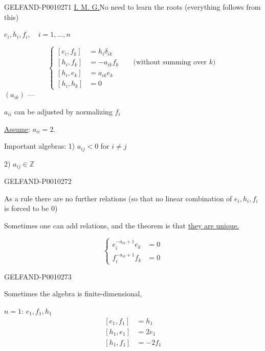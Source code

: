 \begin{GelfandAdjacentEvidence}{GELFAND-P001027}{1}
\underline{\underline{I. M. G.}}\quad {}\quad No need to learn the roots (everything follows from this)

$e_i,h_i,f_i,\quad i=1,\ldots,n$

\begin{equation*}
\left\{\begin{aligned}
[e_i,f_k]&=h_i\delta_{ik}\\
[h_i,f_k]&=-a_{ik}f_k\qquad\text{(without summing over $k$)}\\
[h_i,e_k]&=a_{ik}e_k\\
[h_i,h_k]&=0
\end{aligned}\right.
\tag{1}
\end{equation*}
$(a_{ik})$ --- 

$a_{ii}$ can be adjusted by normalizing $f_i$

\underline{Assume}: $a_{ii}=2$.

Important algebras: 1) $a_{ij}<0$ for $i\ne j$

\hspace{4em}2) $a_{ij}\in\mathbb Z$
\end{GelfandAdjacentEvidence}
\begin{GelfandAdjacentEvidence}{GELFAND-P001027}{2}


As a rule there are no further relations (so that no linear combination of $e_i,h_i,f_i$ is forced to be $0$)

Sometimes one can add relations, and the theorem is that \underline{they are unique.}

\begin{equation*}
\left\{\begin{aligned}
e_i^{-a_{ik}+1}e_k&=0\\
f_i^{-a_{ik}+1}f_k&=0
\end{aligned}\right.
\tag{2}
\end{equation*}
\end{GelfandAdjacentEvidence}
\begin{GelfandAdjacentEvidence}{GELFAND-P001027}{3}


Sometimes the algebra is finite-dimensional,

\underline{$n=1$}: \quad $e_1,f_1,h_1$
\[
\begin{aligned}
[e_1,f_1]&=h_1\\
[h_1,e_1]&=2e_1\\
[h_1,f_1]&=-2f_1
\end{aligned}
\]
\end{GelfandAdjacentEvidence}
